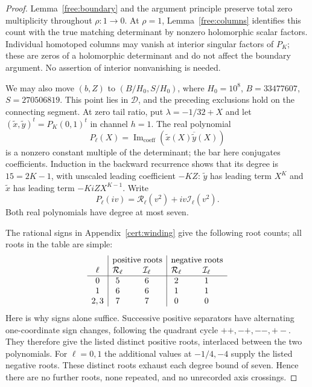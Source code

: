 \begin{proof}
Lemma~\ref{free:boundary} and the argument principle preserve total
zero multiplicity throughout $\rho:1\to0$.  At $\rho=1$,
Lemma~\ref{free:columns} identifies this count with the true matching
determinant by nonzero holomorphic scalar factors.  Individual
homotoped columns may vanish at interior singular factors of $P_K$;
these are zeros of a holomorphic determinant and do not affect the
boundary argument.  No assertion of interior nonvanishing is needed.

We may also move $(b,Z)$ to $(B/H_0,S/H_0)$, where
$H_0=10^8$, $B=33477607$, $S=270506819$.  This point lies in
$\mathcal D$, and the preceding exclusions hold on the connecting
segment.  At zero tail ratio, put $\lambda=-1/32+X$ and let
$(\widetilde x,\widetilde y)^t=P_K(0,1)^t$ in channel $h=1$.
The real polynomial
\[
 P_\ell(X)=\operatorname{Im}_{\mathrm{coeff}}
 (\widetilde x(X)\overline{\widetilde y}(X))
\]
is a nonzero constant multiple of the determinant; the bar here
conjugates coefficients.  Induction in the backward recurrence shows
that its degree is $15=2K-1$, with unscaled leading coefficient $-KZ$:
$\widetilde y$ has leading term $X^K$ and $\widetilde x$ has leading
term $-KiZ X^{K-1}$.  Write
\begin{equation}\label{free:axis-polynomials}
 P_\ell(iv)=\mathcal R_\ell(v^2)+iv\mathcal I_\ell(v^2).
\end{equation}
Both real polynomials have degree at most seven.

The rational signs in Appendix~\ref{cert:winding} give the following
root counts; all roots in the table are simple:
\[
\begin{array}{c|cc|cc}
 &\multicolumn{2}{c|}{\text{positive roots}}&
   \multicolumn{2}{c}{\text{negative roots}}\\
 \ell&\mathcal R_\ell&\mathcal I_\ell&\mathcal R_\ell&\mathcal I_\ell\\\hline
 0&5&6&2&1\\
 1&6&6&1&1\\
 2,3&7&7&0&0
\end{array}
\]
Here is why signs alone suffice.  Successive positive separators have
alternating one-coordinate sign changes, following the quadrant cycle
$++,-+,--,+-$.  They therefore give the listed distinct positive
roots, interlaced between the two polynomials.  For $\ell=0,1$ the
additional values at $-1/4,-4$ supply the listed negative roots.
These distinct roots exhaust each degree bound of seven.  Hence there
are no further roots, none repeated, and no unrecorded axis crossings.


\end{proof}
